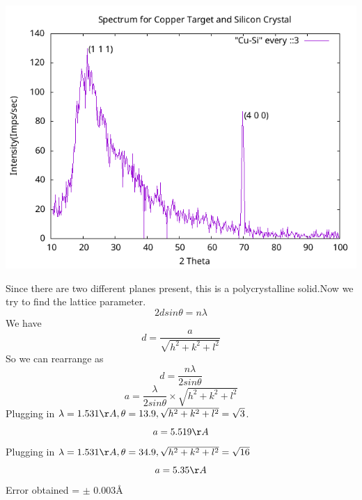 \documentclass[]{report}[12 pt]
\begin{document}
\begin{center}
	\includegraphics[width=10 cm]{cusi1.png}
\end{center}
Since there are two different planes present, this is a polycrystalline solid.Now we try to find the lattice parameter.
\begin{equation*}
	2dsin\theta=n\lambda
\end{equation*}
We have 
\[d=\frac{a}{\sqrt{h^2+k^2+l^2}}\]
So we can rearrange as
\[d=\frac{n\lambda}{2sin\theta}\]
\[a=\frac{\lambda}{2sin\theta}\times\sqrt{h^2+k^2+l^2}\]
 Plugging in $\lambda=1.531{\AA}, \theta=13.9, \sqrt{h^2+k^2+l^2} =\sqrt{3}$.
 \[a=5.519{\AA}\]
 Plugging in $\lambda=1.531{\AA}, \theta=34.9, \sqrt{h^2+k^2+l^2} =\sqrt{16}$
 \[a=5.35{\AA}\]
 Error obtained = $\pm$ 0.003{\AA}
\end{document}
